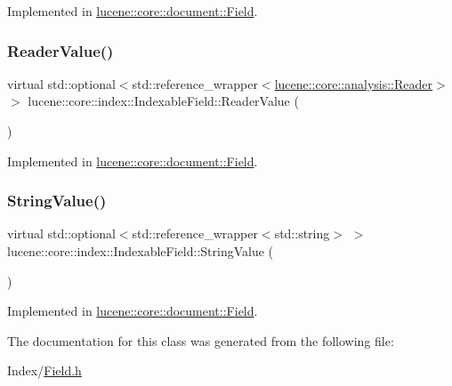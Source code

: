 Implemented in \mbox{\hyperlink{classlucene_1_1core_1_1document_1_1Field_af119306e6d6bf072d815f0f317dd287e}{lucene\+::core\+::document\+::\+Field}}.

\mbox{\label{classlucene_1_1core_1_1index_1_1IndexableField_a5d1bcc66e1f03e2ce8c328302a735486}} 
\subsubsection{\texorpdfstring{Reader\+Value()}{ReaderValue()}}
{\footnotesize\ttfamily virtual std\+::optional$<$std\+::reference\+\_\+wrapper$<$\mbox{\hyperlink{classlucene_1_1core_1_1analysis_1_1Reader}{lucene\+::core\+::analysis\+::\+Reader}}$>$ $>$ lucene\+::core\+::index\+::\+Indexable\+Field\+::\+Reader\+Value (\begin{DoxyParamCaption}{ }\end{DoxyParamCaption})\hspace{0.3cm}{\ttfamily [pure virtual]}}



Implemented in \mbox{\hyperlink{classlucene_1_1core_1_1document_1_1Field_a00a928f1bbae6e9d0e6fe1b3af302160}{lucene\+::core\+::document\+::\+Field}}.

\mbox{\label{classlucene_1_1core_1_1index_1_1IndexableField_ac06f4371ff3011ab247a07e219f43223}} 
\subsubsection{\texorpdfstring{String\+Value()}{StringValue()}}
{\footnotesize\ttfamily virtual std\+::optional$<$std\+::reference\+\_\+wrapper$<$std\+::string$>$ $>$ lucene\+::core\+::index\+::\+Indexable\+Field\+::\+String\+Value (\begin{DoxyParamCaption}{ }\end{DoxyParamCaption})\hspace{0.3cm}{\ttfamily [pure virtual]}}



Implemented in \mbox{\hyperlink{classlucene_1_1core_1_1document_1_1Field_a9eaf712354f0a787e45d4f41b17aeae8}{lucene\+::core\+::document\+::\+Field}}.



The documentation for this class was generated from the following file\+:\begin{DoxyCompactItemize}
\item 
Index/\mbox{\hyperlink{Index_2Field_8h}{Field.\+h}}\end{DoxyCompactItemize}
